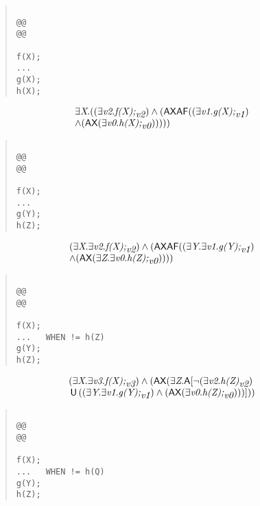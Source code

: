 \documentclass{article}
\newcommand{\U}{\,\mbox{\sf{U}}\,}
\newcommand{\A}{\mbox{\sf{A}}}
\newcommand{\AX}{\mbox{\sf{AX}}}
\newcommand{\AF}{\mbox{\sf{AF}}}
\newcommand{\mita}[1]{\mbox{\it{{#1}}}}
\begin{document}
\begin{quote}\begin{verbatim}

@@
@@

f(X);
...
g(X);
h(X);
\end{verbatim}\end{quote}

\[\begin{array}{l}
\exists \mita{X} . ((\exists \mita{v2} . \mita{f(X);}_{\mita{v2}}) \wedge (\AX\AF((\exists \mita{v1} . \mita{g(X);}_{\mita{v1}})\\ \wedge (\AX(\exists \mita{v0} . \mita{h(X);}_{\mita{v0}})))))
\end{array}\]

\begin{quote}\begin{verbatim}

@@
@@

f(X);
...
g(Y);
h(Z);
\end{verbatim}\end{quote}

\[\begin{array}{l}
(\exists \mita{X} . \exists \mita{v2} . \mita{f(X);}_{\mita{v2}}) \wedge (\AX\AF((\exists \mita{Y} . \exists \mita{v1} . \mita{g(Y);}_{\mita{v1}})\\ \wedge (\AX(\exists \mita{Z} . \exists \mita{v0} . \mita{h(Z);}_{\mita{v0}}))))
\end{array}\]

\begin{quote}\begin{verbatim}

@@
@@

f(X);
...   WHEN != h(Z)
g(Y);
h(Z);
\end{verbatim}\end{quote}

\[\begin{array}{l}
(\exists \mita{X} . \exists \mita{v3} . \mita{f(X);}_{\mita{v3}}) \wedge (\AX(\exists \mita{Z} . \A[\neg (\exists \mita{v2} . \mita{h(Z)}_{\mita{v2}})\\ \U ((\exists \mita{Y} . \exists \mita{v1} . \mita{g(Y);}_{\mita{v1}}) \wedge (\AX(\exists \mita{v0} . \mita{h(Z);}_{\mita{v0}})))]
))
\end{array}\]

\begin{quote}\begin{verbatim}

@@
@@

f(X);
...   WHEN != h(Q)
g(Y);
h(Z);
\end{verbatim}\end{quote}
\end{document}
